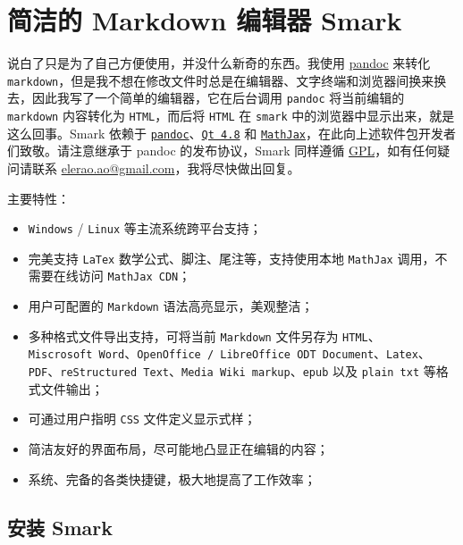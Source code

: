 \hypertarget{ux7b80ux6d01ux7684-markdown-ux7f16ux8f91ux5668-smark}{%
\section{简洁的 Markdown 编辑器
Smark}\label{ux7b80ux6d01ux7684-markdown-ux7f16ux8f91ux5668-smark}}

说白了只是为了自己方便使用，并没什么新奇的东西。我使用
\href{http://johnmacfarlane.net/pandoc/}{pandoc} 来转化
\texttt{markdown}，但是我不想在修改文件时总是在编辑器、文字终端和浏览器间换来换去，因此我写了一个简单的编辑器，它在后台调用
\texttt{pandoc} 将当前编辑的 \texttt{markdown} 内容转化为
\texttt{HTML}，而后将 \texttt{HTML} 在 \texttt{smark}
中的浏览器中显示出来，就是这么回事。Smark 依赖于
\href{http://johnmacfarlane.net/pandoc/}{\texttt{pandoc}}、\href{http://qt-project.org/}{\texttt{Qt\ 4.8}}
和
\href{http://www.mathjax.org}{\texttt{MathJax}}，在此向上述软件包开发者们致敬。请注意继承于
pandoc 的发布协议，Smark 同样遵循
\href{http://www.gnu.org/copyleft/gpl.html}{GPL}，如有任何疑问请联系
\url{elerao.ao@gmail.com}，我将尽快做出回复。

主要特性：

\begin{itemize}
\tightlist
\item
  \texttt{Windows} / \texttt{Linux} 等主流系统跨平台支持；
\item
  完美支持 \texttt{LaTex} 数学公式、脚注、尾注等，支持使用本地
  \texttt{MathJax} 调用，不需要在线访问 \texttt{MathJax\ CDN}；
\item
  用户可配置的 \texttt{Markdown} 语法高亮显示，美观整洁；
\item
  多种格式文件导出支持，可将当前 \texttt{Markdown} 文件另存为
  \texttt{HTML}、
  \texttt{Miscrosoft\ Word}、\texttt{OpenOffice\ /\ LibreOffice\ ODT\ Document}、\texttt{Latex}、\texttt{PDF}、\texttt{reStructured\ Text}、\texttt{Media\ Wiki\ markup}、\texttt{epub}
  以及 \texttt{plain\ txt} 等格式文件输出；
\item
  可通过用户指明 \texttt{CSS} 文件定义显示式样；
\item
  简洁友好的界面布局，尽可能地凸显正在编辑的内容；
\item
  系统、完备的各类快捷键，极大地提高了工作效率；
\end{itemize}

\hypertarget{ux5b89ux88c5-smark}{%
\subsection{安装 Smark}\label{ux5b89ux88c5-smark}}

